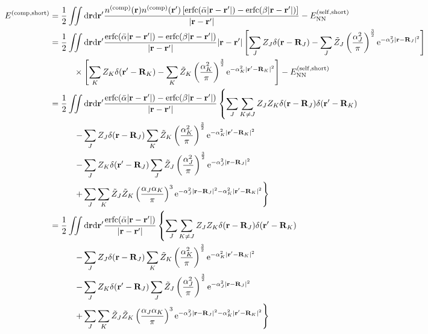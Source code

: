 \documentclass[paper=a4, fontsize=11pt]{article} %
\numberwithin{equation}{section} %
\numberwithin{figure}{section} %
\numberwithin{table}{section} %
\newcommand{\br}{{\bf{r}}}
\newcommand{\bR}{{\bf{R}}}
\newcommand{\rNN}{{\mathrm{NN}}}
\newcommand{\rself}{{\mathrm{self}}}
\newcommand{\re}{{\mathrm{e}}}
\newcommand{\rshort}{{\mathrm{short}}}
\newcommand{\rerfc}{{\mathrm{erfc}}}
\newcommand{\rd}{{\mathrm{d}}}
\newcommand{\rcomp}{{\mathrm{comp}}}
\newcommand{\al}{{\alpha}}
\begin{document}
\begin{equation}
\begin{split}
E^{(\rcomp,\rshort)} 
&= \frac{1}{2}\iint \rd \br \rd \br' \frac{n^{(\rcomp)}(\br)n^{(\rcomp)}(\br')\left[\rerfc(\bar {\al}|\br-\br'|) - \rerfc(\beta|\br-\br'|)\right]} {|\br-\br'|} - E_{\rNN}^{(\rself,\rshort)}\\
&= \frac{1}{2}\iint \rd \br \rd \br' \frac{\rerfc(\bar {\al}|\br-\br'|) - \rerfc(\beta|\br-\br'|)}{|\br-\br'|}{|\br-\br'|} \left[\sum_J Z_J\delta(\br-\bR_J) - \sum_J \tilde Z_J\left(\frac{\al_J^2}{\pi}\right)^{\frac{3}{2}}\re^{-\al_J^2|\br-\bR_J|^2}\right]\\
&\hspace{10mm}\times \left[\sum_K Z_K\delta(\br'-\bR_K) - \sum_K \tilde Z_K\left(\frac{\al_K^2}{\pi}\right)^{\frac{3}{2}}\re^{-\al_K^2|\br'-\bR_K|^2}\right] - E_{\rNN}^{(\rself,\rshort)}\\
&= \frac{1}{2}\iint \rd \br \rd \br' \frac{\rerfc(\bar {\al}|\br-\br'|) - \rerfc(\beta|\br-\br'|)}{|\br-\br'|} \left\{\sum_J \sum_{K \neq J} Z_J Z_K \delta(\br-\bR_J)\delta(\br'-\bR_K) \right. \\
&\left.\hspace{10mm} - \sum_J Z_J\delta(\br-\bR_J) \sum_K \tilde Z_K\left(\frac{\al_K^2}{\pi}\right)^{\frac{3}{2}}\re^{-\al_K^2|\br'-\bR_K|^2} \right. \\
&\left.\hspace{10mm} - \sum_J Z_K\delta(\br'-\bR_J) \sum_J \tilde Z_J\left(\frac{\al_J^2}{\pi}\right)^{\frac{3}{2}}\re^{-\al_J^2|\br-\bR_J|^2} \right. \\
&\left.\hspace{10mm} + \sum_J\sum_K \tilde Z_J\tilde Z_K\left(\frac{\al_J\al_K}{\pi}\right)^3\re^{-\al_J^2|\br-\bR_J|^2-\al_K^2|\br'-\bR_K|^2}\right\}\\
&= \frac{1}{2}\iint \rd \br \rd \br' \frac{\rerfc(\bar {\al}|\br-\br'|)}{|\br-\br'|} \left\{\sum_J \sum_{K \neq J} Z_J Z_K \delta(\br-\bR_J)\delta(\br'-\bR_K) \right. \\
&\left.\hspace{10mm} - \sum_J Z_J\delta(\br-\bR_J) \sum_K \tilde Z_K\left(\frac{\al_K^2}{\pi}\right)^{\frac{3}{2}}\re^{-\al_K^2|\br'-\bR_K|^2} \right. \\
&\left.\hspace{10mm} - \sum_J Z_K\delta(\br'-\bR_J) \sum_J \tilde Z_J\left(\frac{\al_J^2}{\pi}\right)^{\frac{3}{2}}\re^{-\al_J^2|\br-\bR_J|^2} \right. \\
&\left.\hspace{10mm} + \sum_J\sum_K \tilde Z_J\tilde Z_K\left(\frac{\al_J\al_K}{\pi}\right)^3\re^{-\al_J^2|\br-\bR_J|^2-\al_K^2|\br'-\bR_K|^2}\right\}\\

\end{split}
\end{equation}
\end{document}
